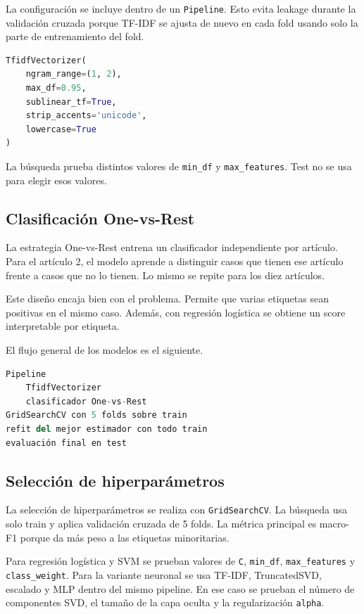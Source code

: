 \documentclass[11pt,a4paper]{article}
\begin{document}
La configuración se incluye dentro de un \texttt{Pipeline}. Esto evita leakage durante la validación cruzada porque TF-IDF se ajusta de nuevo en cada fold usando solo la parte de entrenamiento del fold.

\begin{lstlisting}[language=Python]
TfidfVectorizer(
    ngram_range=(1, 2),
    max_df=0.95,
    sublinear_tf=True,
    strip_accents='unicode',
    lowercase=True
)
\end{lstlisting}

La búsqueda prueba distintos valores de \texttt{min\_df} y \texttt{max\_features}. Test no se usa para elegir esos valores.

\subsection{Clasificación One-vs-Rest}

La estrategia One-vs-Rest entrena un clasificador independiente por artículo. Para el artículo 2, el modelo aprende a distinguir casos que tienen ese artículo frente a casos que no lo tienen. Lo mismo se repite para los diez artículos.

Este diseño encaja bien con el problema. Permite que varias etiquetas sean positivas en el mismo caso. Además, con regresión logística se obtiene un score interpretable por etiqueta.

El flujo general de los modelos es el siguiente.

\begin{lstlisting}[language=Python]
Pipeline
    TfidfVectorizer
    clasificador One-vs-Rest
GridSearchCV con 5 folds sobre train
refit del mejor estimador con todo train
evaluación final en test
\end{lstlisting}

\subsection{Selección de hiperparámetros}

La selección de hiperparámetros se realiza con \texttt{GridSearchCV}. La búsqueda usa solo train y aplica validación cruzada de 5 folds. La métrica principal es macro-F1 porque da más peso a las etiquetas minoritarias.

Para regresión logística y SVM se prueban valores de \texttt{C}, \texttt{min\_df}, \texttt{max\_features} y \texttt{class\_weight}. Para la variante neuronal se usa TF-IDF, TruncatedSVD, escalado y MLP dentro del mismo pipeline. En ese caso se prueban el número de componentes SVD, el tamaño de la capa oculta y la regularización \texttt{alpha}.
\end{document}
